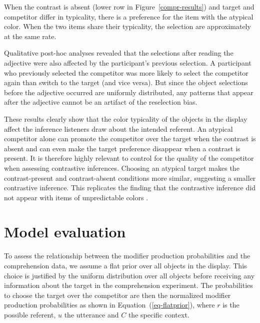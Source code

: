 \documentclass[10pt,letterpaper]{article}
\newcommand{\ek}[1]{\textcolor{Orange}{[ek: #1]}}
\begin{document}
When the contrast is absent (lower row in Figure~\ref{compr-results}) and target and competitor differ in typicality, there is a preference for the item with the atypical color. When the two items share their typicality, the selection are approximately at the same rate. 


Qualitative post-hoc analyses revealed that the selections after reading the adjective were also affected by the participant's previous selection. A participant who previously selected the competitor was more likely to select the competitor again than switch to the target (and vice versa). But since the object selections before the adjective occurred are uniformly distributed, any patterns that appear after the adjective cannot be an artifact of the reselection bias.

These results clearly show that the color typicality of the objects in the display affect the inference listeners draw about the intended referent. An atypical competitor alone can promote the competitor over the target when the contrast is absent and can even make the target preference disappear when a contrast is present. It is therefore highly relevant to control for the quality of the competitor when assessing contrastive inferences. 
Choosing an atypical target makes the contrast-present and contrast-absent conditions more similar, suggesting a smaller contrastive inference. This replicates the finding that the contrastive inference did not appear with items of unpredictable colors \cite{Sedivy:2003}.

\section{Model evaluation}

To assess the relationship between the modifier production probabilities and the comprehension data, we assume a flat prior over all objects in the display. This choice is justified by the uniform distribution over all objects before receiving any information about the target in the comprehension experiment. The probabilities to choose the target over the competitor are then the normalized modifier production probabilities as shown in Equation~(\ref{eq-flatprior}), where $r$ is the possible referent, $u$ the utterance and $C$ the specific context.
\end{document}
